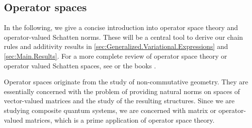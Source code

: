 \documentclass[11pt]{article}
\newcommand{\1}{\ensuremath{\mathbbm{1}}}
\theoremstyle{newdefinition}
\theoremstyle{newplain}
\theoremstyle{myplain}
\begin{document}
\subsection{Operator spaces} \label{pre:operator.spaces}

In the following, we give a concise introduction into operator space theory and operator-valued Schatten norms. These will be a central tool to derive our chain rules and additivity results in \cref{sec:Generalized.Variational.Expressions} and \cref{sec:Main.Results}. 
For a more complete review of operator space theory or operator valued Schatten spaces, see \cite{Beigi.2023} or the books \cite{Book.Pisier.1998, Book.Pisier.2003}.

Operator spaces originate from the study of non-commutative geometry. They are essentially concerned with the problem of providing natural norms on spaces of vector-valued matrices and the study of the resulting structures. Since we are studying composite quantum systems, we are concerned with matrix or operator-valued matrices, which is a prime application of operator space theory. 
\end{document}

